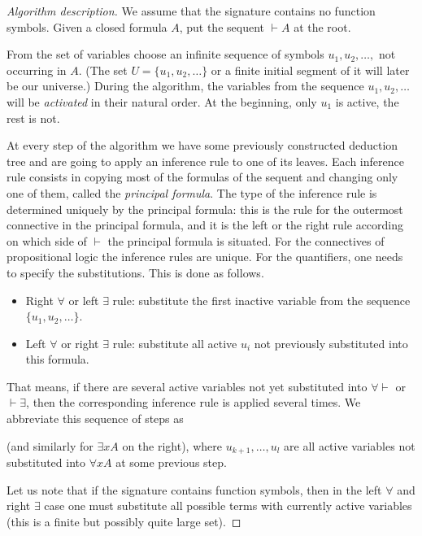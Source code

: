 \begin{proof}[Algorithm description]
We assume that the signature contains no function symbols.
Given a closed formula $A$, put the sequent $\vdash A$ at the root.

From the set of variables choose an infinite sequence of symbols $u_1, u_2, \ldots, $ not occurring in $A$.
(The set $U = \{u_1, u_2, \ldots\}$ or a finite initial segment of it will later be our universe.)
During the algorithm, the variables from the sequence $u_1, u_2, \ldots$ will be \emph{activated} in their natural order.
At the beginning, only $u_1$ is active, the rest is not.

At every step of the algorithm we have some previously constructed deduction tree
and are going to apply an inference rule to one of its leaves.
Each inference rule consists in copying most of the formulas of the sequent and changing only one of them, called the \emph{principal formula}.
The type of the inference rule is determined uniquely by the principal formula: this is the rule for the outermost connective in the principal formula,
and it is the left or the right rule according on which side of $\vdash$ the principal formula is situated.
For the connectives of propositional logic the inference rules are unique.
For the quantifiers, one needs to specify the substitutions.
This is done as follows.

\begin{itemize}
\item
Right $\forall$ or left $\exists$ rule:
substitute the first inactive variable from the sequence $\{u_1, u_2, \ldots\}$.
\item
Left $\forall$ or right $\exists$ rule:
substitute all active $u_i$ not previously substituted into this formula.
\end{itemize}
That means, if there are several active variables not yet substituted into $\forall \vdash$ or $\vdash \exists$,
then the corresponding inference rule is applied several times.
We abbreviate this sequence of steps as
\begin{prooftree}
\end{prooftree}
(and similarly for $\exists x A$ on the right),
where $u_{k+1}, \ldots, u_l$ are all active variables not substituted into $\forall x A$ at some previous step.

Let us note that if the signature contains function symbols, then in the left $\forall$ and right $\exists$ case one
must substitute all possible terms with currently active variables (this is a finite but possibly quite large set).


\end{proof}
